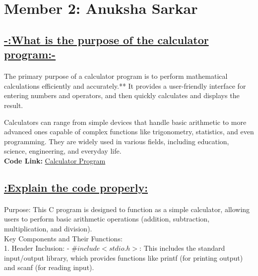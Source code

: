 \documentclass[a4paper,12pt]{article}
\begin{document}
\newpage

\section*{Member 2: Anuksha Sarkar}
\date{\today}
\FloatBarrier 
\begin{center}
\section*{\uline{-:What is the purpose of the calculator program:-}}
\end{center}

\paragraph{}
The primary purpose of a calculator program is to perform mathematical calculations efficiently and accurately.** It provides a user-friendly interface for entering numbers and operators, and then quickly calculates and displays the result. 

Calculators can range from simple devices that handle basic arithmetic to more advanced ones capable of complex functions like trigonometry, statistics, and even programming. They are widely used in various fields, including education, science, engineering, and everyday life.\\
\textbf{Code Link: }\href{https://github.com/Anuksha-2610/Anuksha/blob/main/cal.c}{Calculator Program}

\begin{center}
\section*{\uline{:Explain the code properly:}}
\end{center}

\paragraph{}

Purpose:
This C program is designed to function as a simple calculator, allowing users to perform basic arithmetic operations (addition, subtraction, multiplication, and division).\\

Key Components and Their Functions:\\

1. Header Inclusion:
   - $\#include <stdio.h>$: This includes the standard input/output library, which provides functions like printf (for printing output) and scanf (for reading input).\\
\end{document}
